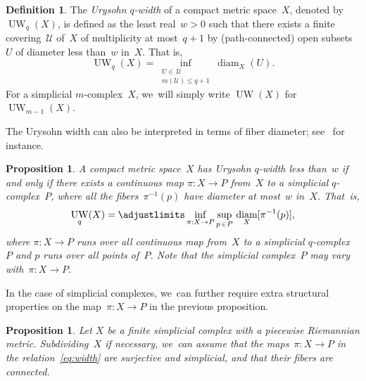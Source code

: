 \documentclass[10pt]{amsart}
\newtheorem{proposition}[theorem]{Proposition}
\theoremstyle{definition}
\newtheorem{definition}[theorem]{Definition}
\DeclareMathOperator\diam{diam}
\DeclareMathOperator{\UW}{UW}
\begin{document}
\begin{definition} \label{def:UW}
The \emph{Urysohn $q$-width} of a compact metric space~$X$, denoted by $\UW_q(X)$, is defined as the least real~$w >0$ such that there exists a finite covering~$\mathcal{U}$ of~$X$ of multiplicity at most~$q+1$ by (path-connected) open subsets~$U$ of diameter less than~$w$ in~$X$.
That is,
\[
\UW_q(X) = \inf_{\substack{U \in \, \mathcal{U} \\ m(\mathcal{U}) \leq q+1}} \diam_X(U).
\]
For a simplicial $m$\nobreakdash-complex~$X$, we~will simply write $\UW(X)$ for~$\UW_{m-1}(X)$.
\end{definition}

The Urysohn width can also be interpreted in terms of fiber diameter; see~\cite[Lem.\,0.8]{Guth17} for instance.

\begin{proposition} \label{prop:UW}
A compact metric space~$X$ has Urysohn $q$-width less than~$w$ if and only if there exists a continuous map $\pi:X \to P$ from~$X$ to a simplicial $q$-complex~$P$, where all the fibers~$\pi^{-1}(p)$ have diameter at most~$w$ in~$X$.
That~is,
\begin{equation} \label{eq:width}
\UW_q(X) = \adjustlimits \inf_{\pi:X \to P} \sup_{p \, \in P} \, \diam_X [\pi^{-1}(p)],
\end{equation}
where $\pi:X \to P$ runs over all continuous map from~$X$ to a simplicial $q$-complex~$P$ and $p$ runs over all points of~$P$.
Note that the simplicial complex~$P$ may vary with~$\pi:X \to P$.
\end{proposition}

In the case of simplicial complexes, we~can further require extra structural properties on the map~$\pi:X \to P$ in the previous proposition.

\begin{proposition} \label{prop:width}
Let $X$ be a finite simplicial complex with a piecewise Riemannian metric.
Subdividing~$X$ if necessary, we~can assume that the maps~$\pi:X \to P$ in the relation~\eqref{eq:width} are surjective and simplicial, and that their fibers are connected.
\end{proposition}
\end{document}
